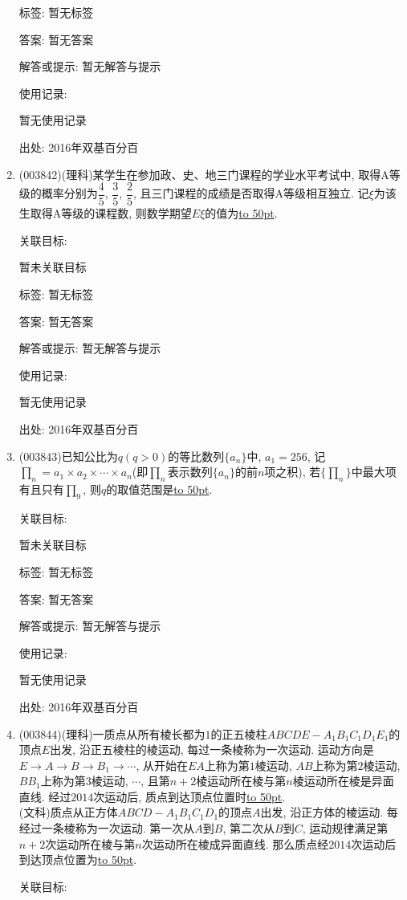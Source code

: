 \documentclass[10pt,a4paper]{article}
\newcommand{\blank}[1]{\underline{\hbox to #1pt{}}}
\begin{document}
\begin{enumerate}[1.]
标签: 暂无标签

答案: 暂无答案

解答或提示: 暂无解答与提示

使用记录:

暂无使用记录


出处: 2016年双基百分百
\item { (003842)}(理科)某学生在参加政、史、地三门课程的学业水平考试中, 取得A等级的概率分别为$\dfrac 45$, $\dfrac 35$, $\dfrac 25$, 且三门课程的成绩是否取得A等级相互独立. 记$\xi$为该生取得A等级的课程数, 则数学期望$E\xi$的值为\blank{50}.


关联目标:

暂未关联目标



标签: 暂无标签

答案: 暂无答案

解答或提示: 暂无解答与提示

使用记录:

暂无使用记录


出处: 2016年双基百分百
\item { (003843)}已知公比为$q(q>0)$的等比数列$\{a_n\}$中, $a_1=256$, 记$\prod_n=a_1\times a_2\times \cdots\times a_n$(即$\prod _n$表示数列$\{a_n\}$的前$n$项之积), 若$\{\prod_n\}$中最大项有且只有$\prod_9$, 则$q$的取值范围是\blank{50}.


关联目标:

暂未关联目标



标签: 暂无标签

答案: 暂无答案

解答或提示: 暂无解答与提示

使用记录:

暂无使用记录


出处: 2016年双基百分百
\item { (003844)}(理科)一质点从所有棱长都为$1$的正五棱柱$ABCDE-A_1B_1C_1D_1E_1$的顶点$E$出发, 沿正五棱柱的棱运动, 每过一条棱称为一次运动. 运动方向是$E\to A\to B\to B_1\to \cdots$, 从开始在$EA$上称为第$1$棱运动, $AB$上称为第$2$棱运动, $BB_1$上称为第$3$棱运动, $\cdots$, 且第$n+2$棱运动所在棱与第$n$棱运动所在棱是异面直线. 经过$2014$次运动后, 质点到达顶点位置时\blank{50}.\\
(文科)质点从正方体$ABCD-A_1B_1C_1D_1$的顶点$A$出发, 沿正方体的棱运动. 每经过一条棱称为一次运动. 第一次从$A$到$B$, 第二次从$B$到$C$, 运动规律满足第$n+2$次运动所在棱与第$n$次运动所在棱成异面直线. 那么质点经$2014$次运动后到达顶点位置为\blank{50}.


关联目标:


\end{enumerate}
\end{document}
